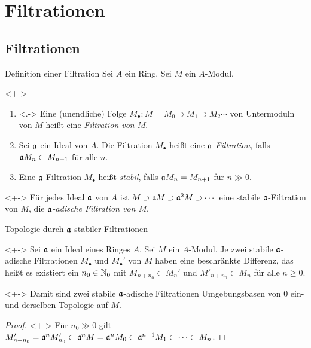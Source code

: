 \section{Filtrationen}

\subsection{Filtrationen}

\begin{frame}{Definition einer Filtration}
	Sei \(A\) ein Ring. Sei \(M\) ein \(A\)-Modul.
	\begin{definition}<+->
		\begin{enumerate}[<+->]
		\item<.->
			Eine (unendliche) Folge
			\(M_\bullet\colon M = M_0 \supset M_1 \supset M_2 \dotsb\) von Untermoduln von
			\(M\) heißt eine \emph{Filtration von \(M\)}.
		\item
			Sei \(\mathfrak{a}\) ein Ideal von \(A\). Die Filtration \(M_\bullet\) heißt eine
			\emph{\(\mathfrak{a}\)-Filtration}, falls \(\mathfrak{a} M_n \subset M_{n + 1}\) für alle \(n\).
		\item
			Eine \(\mathfrak{a}\)-Filtration \(M_\bullet\) heißt \emph{stabil}, falls
			\(\mathfrak{a} M_n = M_{n + 1}\) für \(n \gg 0\).
		\end{enumerate}
	\end{definition}
	\begin{example}<+->
		Für jedes Ideal \(\mathfrak{a}\) von \(A\) ist \(M \supset \mathfrak{a} M \supset \mathfrak{a}^2 M \supset \dotsb\)
		eine stabile \(\mathfrak{a}\)-Filtration von \(M\), die \emph{\(\mathfrak{a}\)-adische Filtration von \(M\)}.
	\end{example}
\end{frame}

\begin{frame}{Topologie durch \(\mathfrak{a}\)-stabiler Filtrationen}
	\begin{lemma}<+->
		Sei \(\mathfrak{a}\) ein Ideal eines Ringes \(A\). Sei \(M\) ein \(A\)-Modul. Je
		zwei stabile \(\mathfrak{a}\)-adische Filtrationen \(M_\bullet\) und \(M_\bullet'\) 
		von \(M\) haben eine beschränkte Differenz, das heißt es existiert ein \(n_0 \in \mathbb N_0\) mit
		\(M_{n + n_0} \subset M_n'\) und \(M'_{n + n_0} \subset M_n\) für alle \(n \ge 0\).
	\end{lemma}
	\begin{visibleenv}<+->
		Damit sind zwei stabile \(\mathfrak{a}\)-adische Filtrationen Umgebungsbasen von \(0\) ein- und derselben
		Topologie auf \(M\).
	\end{visibleenv}
	\begin{proof}<+->
		Für \(n_0 \gg 0\) gilt
		\(M'_{n + n_0} = \mathfrak{a}^n M'_{n_0} \subset \mathfrak{a}^n M = \mathfrak{a}^n M_0 \subset \mathfrak{a}^{n - 1} M_1 \subset \dotsb
		\subset M_n\).
	\end{proof}
\end{frame}

